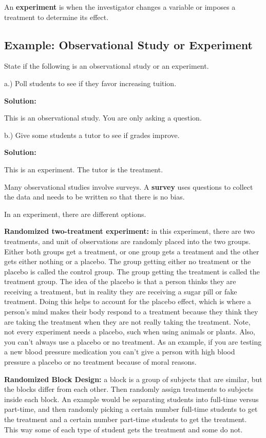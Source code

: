 \documentclass[]{book}
\begin{document}
An \textbf{experiment} is when the investigator changes a variable or imposes a treatment to determine its effect.

\hypertarget{example-observational-study-or-experiment}{%
\subsection{Example: Observational Study or Experiment}\label{example-observational-study-or-experiment}}

State if the following is an observational study or an experiment.

a.) Poll students to see if they favor increasing tuition.

\textbf{Solution:}

This is an observational study. You are only asking a question.

b.) Give some students a tutor to see if grades improve.

\textbf{Solution:}

This is an experiment. The tutor is the treatment.

Many observational studies involve surveys. A \textbf{survey} uses questions to collect the data and needs to be written so that there is no bias.

In an experiment, there are different options.

\textbf{Randomized two-treatment experiment:} in this experiment, there are two treatments, and unit of observations are randomly placed into the two groups. Either both groups get a treatment, or one group gets a treatment and the other gets either nothing or a placebo. The group getting either no treatment or the placebo is called the control group. The group getting the treatment is called the treatment group. The idea of the placebo is that a person thinks they are receiving a treatment, but in reality they are receiving a sugar pill or fake treatment. Doing this helps to account for the placebo effect, which is where a person's mind makes their body respond to a treatment because they think they are taking the
treatment when they are not really taking the treatment. Note, not every experiment needs a placebo, such when using animals or plants. Also, you can't always use a placebo or no treatment. As an example, if you are testing a new blood pressure medication you can't give a person with high blood pressure a placebo or no treatment because of moral reasons.

\textbf{Randomized Block Design:} a block is a group of subjects that are similar, but the blocks differ from each other. Then randomly assign treatments to subjects inside each block. An example would be separating students into full-time versus part-time, and then randomly picking a certain number full-time students to get the treatment and a certain number part-time students to get the treatment. This way some of each type of student gets the treatment and some do not.
\end{document}
